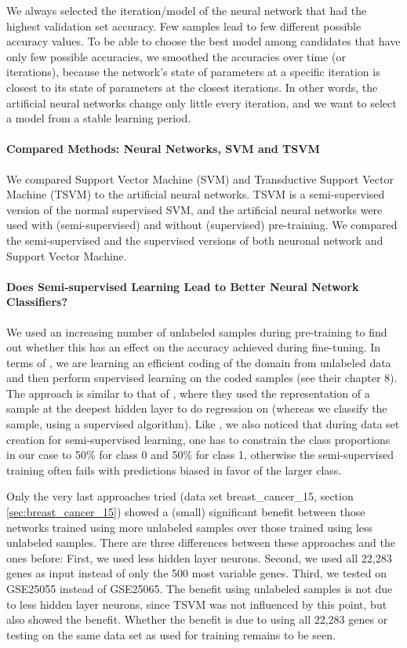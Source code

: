 We always selected the iteration/model of the neural network that
had the highest validation set accuracy. Few samples lead to few different
possible accuracy values. To be able to choose the best model among
candidates that have only few possible accuracies, we smoothed the
accuracies over time (or iterations), because the network's state
of parameters at a specific iteration is closest to its state of parameters
at the closest iterations. In other words, the artificial neural networks
change only little every iteration, and we want to select a model
from a stable learning period.

\paragraph{Compared Methods: Neural Networks, SVM and TSVM}

We compared Support Vector Machine (SVM) and Transductive Support
Vector Machine (TSVM) to the artificial neural networks. TSVM is a
semi-supervised version of the normal supervised SVM, and the artificial
neural networks were used with (semi-supervised) and without (supervised)
pre-training. We compared the semi-supervised and the supervised versions
of both neuronal network and Support Vector Machine.

\paragraph{Does Semi-supervised Learning Lead to Better Neural Network Classifiers?}

We used an increasing number of unlabeled samples during pre-training
to find out whether this has an effect on the accuracy achieved during
fine-tuning. In terms of \cite{Zhu2005}, we are learning an efficient
coding of the domain from unlabeled data and then perform supervised
learning on the coded samples (see their chapter 8). The approach
is similar to that of \cite{ChenXie2015}, where they used the representation
of a sample at the deepest hidden layer to do regression on (whereas
we classify the sample, using a supervised algorithm). Like \cite{Zhu2005},
we also noticed that during data set creation for semi-supervised
learning, one has to constrain the class proportions \textendash{}
in our case to 50\% for class 0 and 50\% for class 1, otherwise the
semi-supervised training often fails with predictions biased in favor
of the larger class.

Only the very last approaches tried (data set breast\_cancer\_15,
section \ref{sec:breast_cancer_15}) showed a (small) significant
benefit between those networks trained using more unlabeled samples
over those trained using less unlabeled samples. There are three differences
between these approaches and the ones before: First, we used less
hidden layer neurons. Second, we used all 22,283 genes as input instead
of only the 500 most variable genes. Third, we tested on GSE25055
instead of GSE25065. The benefit using unlabeled samples is not due
to less hidden layer neurons, since TSVM was not influenced by this
point, but also showed the benefit. Whether the benefit is due to
using all 22,283 genes or testing on the same data set as used for
training remains to be seen.

